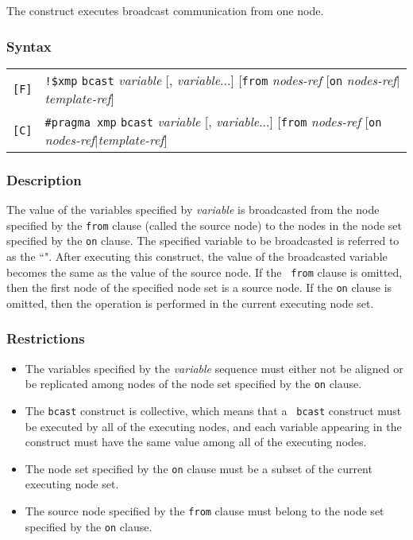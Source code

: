 The {\tt {}} construct executes broadcast communication
from one node.

\subsubsection*{Syntax}

\begin{tabular}{ll}
\verb![F]! & \verb|!$xmp| {\tt bcast} {\it variable} 
[, {\it variable}...] [{\tt from} {\it nodes-ref} [{\tt on} {\it
  nodes-ref}$\vert${\it template-ref}] \\
\verb![C]! & \verb|#pragma xmp| {\tt bcast} {\it variable} 
[, {\it variable}...] [{\tt from} {\it nodes-ref} [{\tt on} {\it
  nodes-ref}$\vert${\it template-ref}] \\
\end{tabular}

\subsubsection*{Description}

The value of the variables specified by {\it variable} is broadcasted
from the node specified by the {\tt from} clause (called the source node) to
the nodes in the node set specified by the {\tt on} clause. The specified
variable to be broadcasted is referred to as the ``". After executing this construct, the value of the broadcasted
variable becomes the same as the value of the source node. If the {\tt
from} clause is omitted, then the first node of the specified node set
is a source node. If the {\tt on} clause is omitted, then the operation
is performed in the current executing node set.

\subsubsection*{Restrictions}

\begin{itemize}
\item The variables specified by the {\it variable} sequence must
      either not be aligned or be replicated among nodes of the node set
      specified by the {\tt on} clause.
\item The {\tt bcast} construct is collective, which means that a {\tt
      bcast} construct must be executed by all of the executing nodes,
      and each variable appearing in the construct must have the same
      value among all of the executing nodes.
\item The node set specified by the {\tt on} clause must be a subset of the
      current executing node set.
\item The source node specified by the {\tt from} clause must belong to
      the node set specified by the {\tt on} clause. 
\end{itemize}

